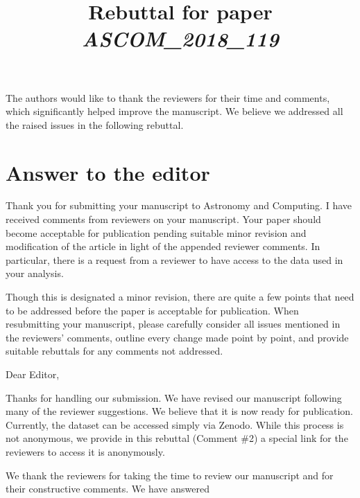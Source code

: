 \documentclass[12pt,a4paper]{article}
\title{\vspace{-1cm}
\begin{flushleft} {\sffamily Rebuttal for paper \emph{ASCOM\_2018\_119} }\end{flushleft}}
\date{\vspace{-1.7cm}\begin{flushleft}\sffamily DeepSphere: Efficient spherical Convolutional Neural Network with HEALPix sampling for cosmological applications, Nathanaël Perraudin, Michaël Defferrard, Tomasz Kacprzak, Raphael Sgier \end{flushleft}}
\newcommand{\1}{\b{1}}              %
\newcommand{\0}{\b{0}}              %
\begin{document}
\maketitle


The authors would like to thank the reviewers for their time and comments, which significantly helped improve the manuscript.
We believe we addressed all the raised issues in the following rebuttal.

\section*{Answer to the editor}


\begin{mdframed}[style=comment]
Thank you for submitting your manuscript to Astronomy and Computing. I have received comments from reviewers on your manuscript. Your paper should become acceptable for publication pending suitable minor revision and modification of the article in light of the appended reviewer comments.  In particular, there is a request from a reviewer to have access to the data used in your analysis.

Though this is designated a minor revision, there are quite a few points that need to be addressed before the paper is acceptable for publication.  When resubmitting your manuscript, please carefully consider all issues mentioned in the reviewers' comments, outline every change made point by point, and provide suitable rebuttals for any comments not addressed.
\end{mdframed}

Dear Editor,

Thanks for handling our submission. We have revised our manuscript following many of the reviewer suggestions. We believe that it is now ready for publication. Currently, the dataset can be accessed simply via Zenodo. While this process is not anonymous, we provide in this rebuttal (Comment \#2) a special link for the reviewers to access it is anonymously.

We thank the reviewers for taking the time to review our manuscript and for their constructive comments. We have answered


\newpage

\section{}
\end{document}
